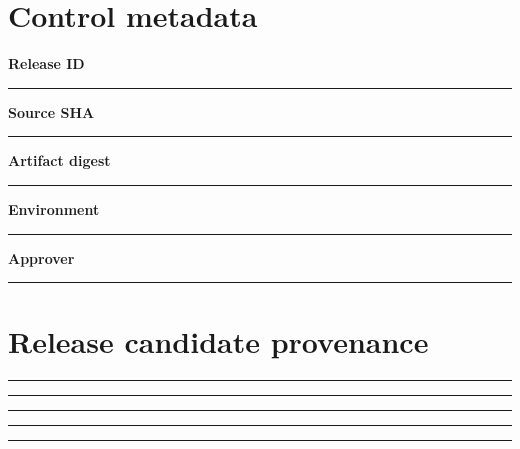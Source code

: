 \documentclass[11pt,letterpaper]{article}
\begin{document}
\makedoctitle\makedocsummary
\section{Control metadata}
\noindent\textbf{Release ID}\par\nobreak\vspace{6pt}\noindent\rule{0.93\linewidth}{0.4pt}\par\vspace{14pt}
\noindent\textbf{Source SHA}\par\nobreak\vspace{6pt}\noindent\rule{0.93\linewidth}{0.4pt}\par\vspace{14pt}
\noindent\textbf{Artifact digest}\par\nobreak\vspace{6pt}\noindent\rule{0.93\linewidth}{0.4pt}\par\vspace{14pt}
\noindent\textbf{Environment}\par\nobreak\vspace{6pt}\noindent\rule{0.93\linewidth}{0.4pt}\par\vspace{14pt}
\noindent\textbf{Approver}\par\nobreak\vspace{6pt}\noindent\rule{0.93\linewidth}{0.4pt}\par\vspace{14pt}
\section{Release candidate provenance}
\vspace{2mm}
\noindent\rule{0.93\linewidth}{0.4pt}\par\vspace{13pt}
\noindent\rule{0.93\linewidth}{0.4pt}\par\vspace{13pt}
\noindent\rule{0.93\linewidth}{0.4pt}\par\vspace{13pt}
\noindent\rule{0.93\linewidth}{0.4pt}\par\vspace{13pt}
\noindent\rule{0.93\linewidth}{0.4pt}\par\vspace{13pt}
\end{document}
